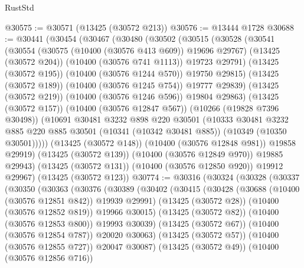 \begin{lexlean}{RustStd}
\begin{coremodule}
{\begin{coremodule}
{{{{{{{{{{{{{{{{{{{{{{{{{@30575 := @30571 (@13425 (@30572 @213))
@30576 := @13444 @1728
@30688 := @30441
    (@30454
      (@30467
        (@30480
          (@30502
            (@30515
              (@30528
                (@30541
                  (@30554
                    (@30575 (@10400 (@30576 @413 @609)) @19696 @29767)
                    (@13425 (@30572 @204))
                    (@10400 (@30576 @741 @1113))
                    @19723
                    @29791)
                  (@13425 (@30572 @195))
                  (@10400 (@30576 @1244 @570))
                  @19750
                  @29815)
                (@13425 (@30572 @189))
                (@10400 (@30576 @1245 @754))
                @19777
                @29839)
              (@13425 (@30572 @219))
              (@10400 (@30576 @1246 @596))
              @19804
              @29863)
            (@13425 (@30572 @157))
            (@10400 (@30576 @12847 @567))
            (@10266 (@19828 @7396 @30498))
            (@10691
              @30481
              @3232
              @898
              @220
              @30501
              (@10333
                @30481
                @3232
                @885
                @220
                @885
                @30501
                (@10341 (@10342 @30481 @885))
                (@10349 (@10350 @30501)))))
          (@13425 (@30572 @148))
          (@10400 (@30576 @12848 @981))
          @19858
          @29919)
        (@13425 (@30572 @139))
        (@10400 (@30576 @12849 @970))
        @19885
        @29943)
      (@13425 (@30572 @131))
      (@10400 (@30576 @12850 @920))
      @19912
      @29967)
    (@13425 (@30572 @123))
@30774 := @30316
    (@30324
      (@30328
        (@30337
          (@30350
            (@30363
              (@30376
                (@30389
                  (@30402
                    (@30415
                      (@30428
                        (@30688 (@10400 (@30576 @12851 @842)) @19939 @29991)
                        (@13425 (@30572 @28))
                        (@10400 (@30576 @12852 @819))
                        @19966
                        @30015)
                      (@13425 (@30572 @82))
                      (@10400 (@30576 @12853 @800))
                      @19993
                      @30039)
                    (@13425 (@30572 @67))
                    (@10400 (@30576 @12854 @787))
                    @20020
                    @30063)
                  (@13425 (@30572 @57))
                  (@10400 (@30576 @12855 @727))
                  @20047
                  @30087)
                (@13425 (@30572 @49))
                (@10400 (@30576 @12856 @716))
}}}}}}}}}}}}}}}}}}}}}}}}}
\end{coremodule}}
\end{coremodule}
\end{lexlean}
